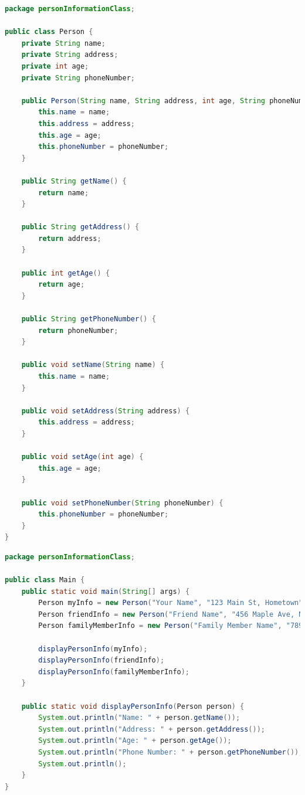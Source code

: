 \documentclass{article}
\begin{document}
\begin{lstlisting}[language=Java, caption=Person.java]
package personInformationClass;

public class Person {
    private String name;
    private String address;
    private int age;
    private String phoneNumber;

    public Person(String name, String address, int age, String phoneNumber) {
        this.name = name;
        this.address = address;
        this.age = age;
        this.phoneNumber = phoneNumber;
    }

    public String getName() {
        return name;
    }

    public String getAddress() {
        return address;
    }

    public int getAge() {
        return age;
    }

    public String getPhoneNumber() {
        return phoneNumber;
    }

    public void setName(String name) {
        this.name = name;
    }

    public void setAddress(String address) {
        this.address = address;
    }

    public void setAge(int age) {
        this.age = age;
    }

    public void setPhoneNumber(String phoneNumber) {
        this.phoneNumber = phoneNumber;
    }
}

\end{lstlisting}

\begin{lstlisting}[language=Java, caption=Main.java]
package personInformationClass;

public class Main {
    public static void main(String[] args) {
        Person myInfo = new Person("Your Name", "123 Main St, Hometown", 30, "555-1234");
        Person friendInfo = new Person("Friend Name", "456 Maple Ave, Nearby Town", 25, "555-5678");
        Person familyMemberInfo = new Person("Family Member Name", "789 Oak Dr, Family Town", 55, "555-8765");

        displayPersonInfo(myInfo);
        displayPersonInfo(friendInfo);
        displayPersonInfo(familyMemberInfo);
    }

    public static void displayPersonInfo(Person person) {
        System.out.println("Name: " + person.getName());
        System.out.println("Address: " + person.getAddress());
        System.out.println("Age: " + person.getAge());
        System.out.println("Phone Number: " + person.getPhoneNumber());
        System.out.println();
    }
}

\end{lstlisting}
\end{document}
